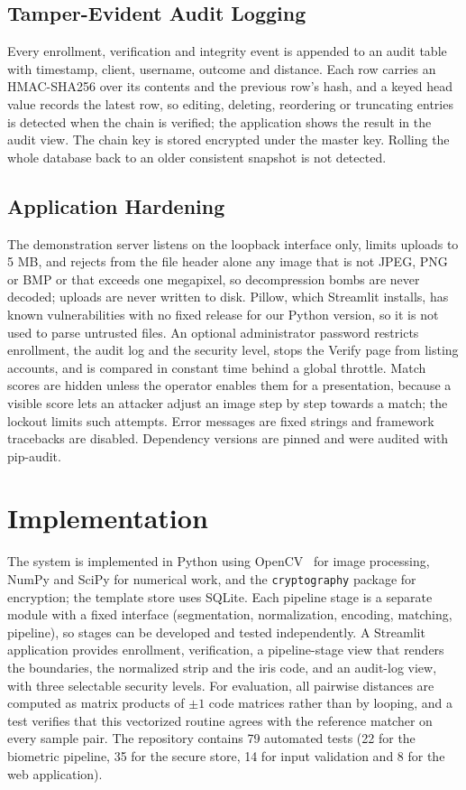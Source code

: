 \documentclass[conference]{IEEEtran}
\begin{document}
\subsection{Tamper-Evident Audit Logging}
Every enrollment, verification and integrity event is appended to an audit table with timestamp, client, username, outcome and distance. Each row carries an HMAC-SHA256 over its contents and the previous row's hash, and a keyed head value records the latest row, so editing, deleting, reordering or truncating entries is detected when the chain is verified; the application shows the result in the audit view. The chain key is stored encrypted under the master key. Rolling the whole database back to an older consistent snapshot is not detected.

\subsection{Application Hardening}
The demonstration server listens on the loopback interface only, limits uploads to 5 MB, and rejects from the file header alone any image that is not JPEG, PNG or BMP or that exceeds one megapixel, so decompression bombs are never decoded; uploads are never written to disk. Pillow, which Streamlit installs, has known vulnerabilities with no fixed release for our Python version, so it is not used to parse untrusted files. An optional administrator password restricts enrollment, the audit log and the security level, stops the Verify page from listing accounts, and is compared in constant time behind a global throttle. Match scores are hidden unless the operator enables them for a presentation, because a visible score lets an attacker adjust an image step by step towards a match; the lockout limits such attempts. Error messages are fixed strings and framework tracebacks are disabled. Dependency versions are pinned and were audited with pip-audit.

\section{Implementation}
The system is implemented in Python using OpenCV~\cite{opencv} for image processing, NumPy and SciPy for numerical work, and the \texttt{cryptography} package for encryption; the template store uses SQLite. Each pipeline stage is a separate module with a fixed interface (segmentation, normalization, encoding, matching, pipeline), so stages can be developed and tested independently. A Streamlit application provides enrollment, verification, a pipeline-stage view that renders the boundaries, the normalized strip and the iris code, and an audit-log view, with three selectable security levels. For evaluation, all pairwise distances are computed as matrix products of $\pm1$ code matrices rather than by looping, and a test verifies that this vectorized routine agrees with the reference matcher on every sample pair. The repository contains 79 automated tests (22 for the biometric pipeline, 35 for the secure store, 14 for input validation and 8 for the web application).
\end{document}
